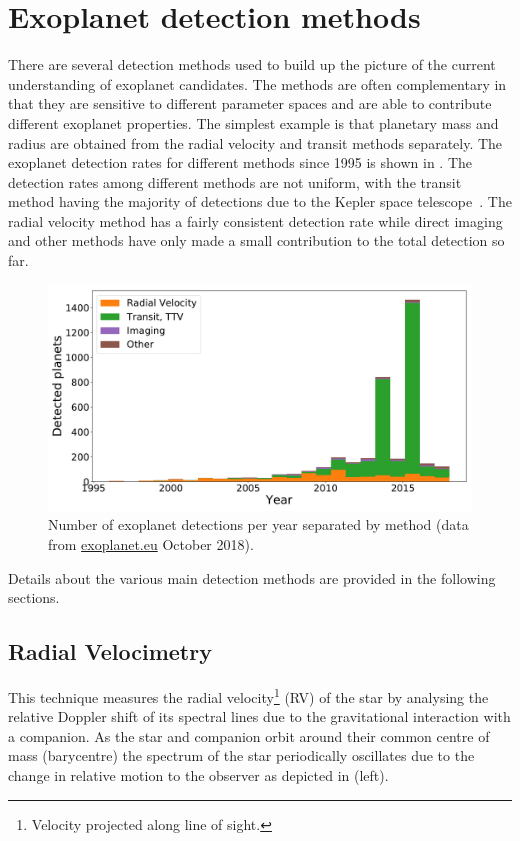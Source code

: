 

\section{Exoplanet detection methods}
\label{sec:detection_methods}
There are several detection methods used to build up the picture of the current understanding of exoplanet candidates.
The methods are often complementary in that they are sensitive to different parameter spaces and are able to contribute different exoplanet properties.
The simplest example is that planetary mass and radius are obtained from the radial velocity and transit methods separately.
The exoplanet detection rates for different methods since 1995 is shown in .
The detection rates among different methods are not uniform, with the transit method having the majority of detections due to the Kepler space telescope~\citep{borucki_finding_2008}.
The radial velocity method has a fairly consistent detection rate while direct imaging and other methods have only made a small contribution to the total detection so far.

\begin{figure}
    \centering
    \includegraphics[width=0.7\linewidth]{./figures/introduction/exoplanetEU_year_method.pdf}
    \caption{Number of exoplanet detections per year separated by method (data from \href{http://ww.exoplanet.eu}{exoplanet.eu} October 2018).}
    \label{fig:detection_year_method}
\end{figure}


Details about the various main detection methods are provided in the following sections.

\subsection{Radial Velocimetry}
\label{sub:radial_velocimetry}
This technique measures the radial velocity\footnote{Velocity projected along line of sight.} (RV) of the star by analysing the relative Doppler shift of its spectral lines due to the gravitational interaction with a companion.
As the star and companion orbit around their common centre of mass (barycentre) the spectrum of the star periodically oscillates due to the change in relative motion to the observer as depicted in  (left).

